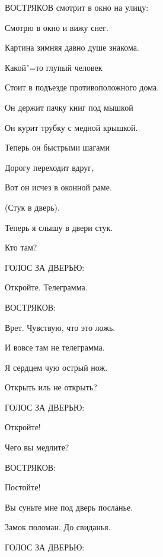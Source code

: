 \begin{flushleft}ВОСТРЯКОВ смотрит в окно на улицу:\end{flushleft}

Смотрю в окно и вижу снег.

Картина зимняя давно душе знакома.

Какой"=то глупый человек

Стоит в подъезде противоположного дома.

Он держит пачку книг под мышкой

Он курит трубку с медной крышкой.

Теперь он быстрыми шагами

Дорогу переходит вдруг,

Вот он исчез в оконной раме.
           
\begin{center}(Стук в дверь).\end{center}

Теперь я слышу в двери стук.

Кто там?

\begin{flushleft}ГОЛОС ЗА ДВЕРЬЮ:\end{flushleft}
   
Откройте. Телеграмма.

\begin{flushleft}ВОСТРЯКОВ:\end{flushleft}

Врет. Чувствую, что это ложь.

И вовсе там не телеграмма.

Я сердцем чую острый нож.

Открыть иль не открыть?

\begin{flushleft}ГОЛОС ЗА ДВЕРЬЮ:\end{flushleft}

Откройте!

Чего вы медлите?

\begin{flushleft}ВОСТРЯКОВ:\end{flushleft}

Постойте!

Вы суньте мне под дверь посланье.

Замок поломан. До свиданья.

\begin{flushleft}ГОЛОС ЗА ДВЕРЬЮ:\end{flushleft}

